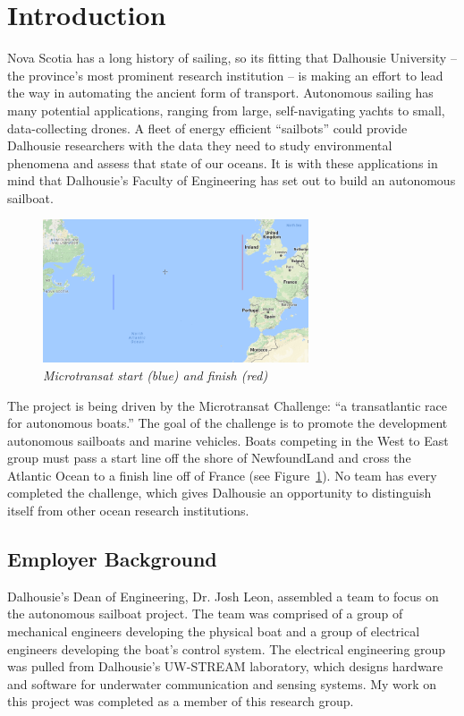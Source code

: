 \documentclass[12pt]{article}
\begin{document}

\section{Introduction}
Nova Scotia has a long history of sailing, so its fitting that Dalhousie University -- the province's most prominent research institution -- is making an effort to lead the way in automating the ancient form of transport. Autonomous sailing has many potential applications, ranging from large, self-navigating yachts to small, data-collecting drones. A fleet of energy efficient ``sailbots'' could provide Dalhousie researchers with the data they need to study environmental phenomena and assess that state of our oceans. It is with these applications in mind that Dalhousie's Faculty of Engineering has set out to build an autonomous sailboat.

\begin{figure}[h]
	\centering
	\includegraphics[width=0.7\textwidth]{figures/start_finish.png}
	\caption[Microtransat start and finish]{\textsl{Microtransat start (blue) and finish (red)} \cite{micro_map}}
	\label{fig:start_finish}
\end{figure}

The project is being driven by the Microtransat Challenge: ``a transatlantic race for autonomous boats.'' \cite{micro_main} The goal of the challenge is to promote the development autonomous sailboats and marine vehicles. Boats competing in the West to East group must pass a start line off the shore of NewfoundLand and cross the Atlantic Ocean to a finish line off of France (see Figure~\ref{fig:start_finish}). No team has every completed the challenge, which gives Dalhousie an opportunity to distinguish itself from other ocean research institutions. 

\subsection{Employer Background}
Dalhousie's Dean of Engineering, Dr. Josh Leon, assembled a team to focus on the autonomous sailboat project. The team was comprised of a group of mechanical engineers developing the physical boat and a group of electrical engineers developing the boat's control system. The electrical engineering group was pulled from Dalhousie's UW-STREAM laboratory, which designs hardware and software for underwater communication and sensing systems. My work on this project was completed as a member of this research group.
\end{document}
